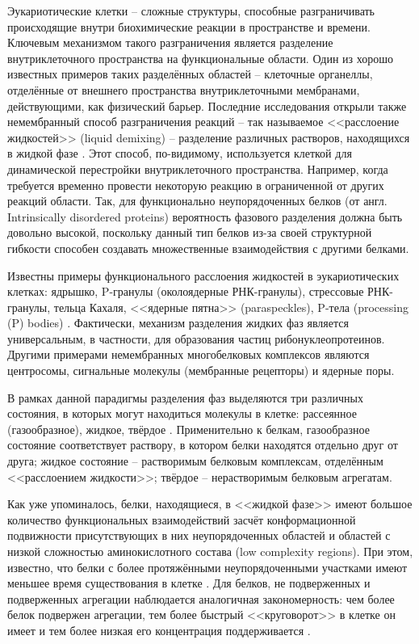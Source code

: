 Эукариотические клетки -- сложные структуры, способные разграничивать происходящие внутри биохимические реакции в пространстве и времени. Ключевым механизмом такого разграничения является разделение внутриклеточного пространства на функциональные области. Один из хорошо известных примеров таких разделённых областей -- клеточные органеллы, отделённые от внешнего пространства внутриклеточными мембранами, действующими, как физический барьер. Последние исследования открыли также немембранный способ разграничения реакций -- так называемое <<расслоение жидкостей>> (liquid demixing) -- разделение различных растворов, находящихся в жидкой фазе \cite{Aguzzi2016}. Этот способ, по-видимому, используется клеткой для динамической перестройки внутриклеточного пространства. Например, когда требуется временно провести некоторую реакцию в ограниченной от других реакций области. Так, для функционально неупорядоченных белков (от англ. Intrinsically disordered proteins) вероятность фазового разделения должна быть довольно высокой, поскольку данный тип белков из-за своей структурной гибкости способен создавать множественные взаимодействия с другими белками.

Известны примеры функционального расслоения жидкостей в эукариотических клетках: ядрышко, P-гранулы (околоядерные РНК-гранулы), стрессовые РНК-гранулы, тельца Кахаля, <<ядерные пятна>> (paraspeckles), P-тела (processing (P) bodies) \cite{Aguzzi2016}. Фактически, механизм разделения жидких фаз является универсальным, в частности, для образования частиц рибонуклеопротеинов. Другими примерами немембранных многобелковых комплексов являются центросомы, сигнальные молекулы (мембранные рецепторы) и ядерные поры.

В рамках данной парадигмы разделения фаз выделяются три различных состояния, в которых могут находиться молекулы в клетке: рассеянное (газообразное), жидкое, твёрдое \cite{Aguzzi2016}. Применительно к белкам, газообразное состояние соответствует раствору, в котором белки находятся отдельно друг от друга; жидкое состояние -- растворимым белковым комплексам, отделённым <<расслоением жидкости>>; твёрдое -- нерастворимым белковым агрегатам.

Как уже упоминалось, белки, находящиеся, в <<жидкой фазе>> имеют большое количество функциональных взаимодействий засчёт конформационной подвижности присутствующих в них неупорядоченных областей и областей с низкой сложностью аминокислотного состава (low complexity regions). При этом, известно, что белки с более протяжёнными неупорядоченными участками имеют меньшее время существования в клетке \cite{VanderLee2014}. Для белков, не подверженных и подверженных агрегации наблюдается аналогичная закономерность: чем более белок подвержен агрегации, тем более быстрый <<круговорот>> в клетке он имеет и тем более низкая его концентрация поддерживается \cite{Gsponer2012}.

